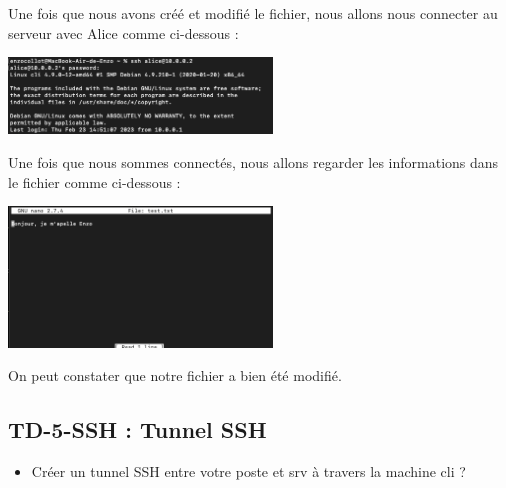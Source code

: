 \documentclass[12pt]{article}
\begin{document}
\vspace{0.3cm}

Une fois que nous avons créé et modifié le fichier, nous allons nous connecter au serveur avec Alice comme ci-dessous :

\vspace{0.3cm}

\begin{center}
  \includegraphics[width=7cm]{Images-Client-SSH/Image-TD-SSH-4/connexion-ssh.png}
\end{center}

\vspace{0.3cm}

Une fois que nous sommes connectés, nous allons regarder les informations dans le fichier comme ci-dessous :

\vspace{0.3cm}

\begin{center}
  \includegraphics[width=7cm]{Images-Client-SSH/Image-TD-SSH-4/verfication-fichier.png}
\end{center}

\vspace{0.3cm}

On peut constater que notre fichier a bien été modifié.

\newpage

\subsection{TD-5-SSH : Tunnel SSH}

\vspace{0.3cm}

\begin{itemize}
  \item Créer un tunnel SSH entre votre poste et srv à travers la machine cli ?
\end{itemize}
\end{document}
